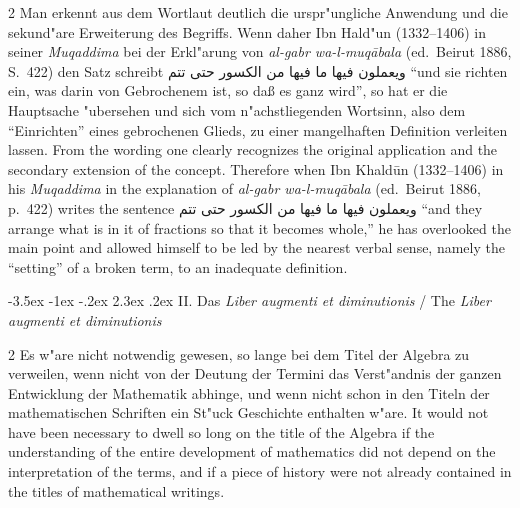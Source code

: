 \documentclass[10pt,a4paper]{article}
\makeatletter
\renewcommand{\switchcolumn}{\syncronize\nointerlineskip\columnbreak}
\newcommand{\RL}[1]{\beginR#1\endR}
\newcommand{\ar}[1]{{\arabicfont\RL{#1}}}
\renewcommand{\section}{\@startsection{section}{1}{\z@}%
  {-3.5ex \@plus -1ex \@minus -.2ex}%
  {2.3ex \@plus .2ex}%
  {\normalfont\Large\bfseries\color{sectioncolor}}}
\newcommand{\enquote}[1]{``#1''}
\makeatother
\begin{document}
\begin{paracol}{2}
Man erkennt aus dem Wortlaut deutlich die urspr"ungliche Anwendung und die sekund"are Erweiterung des Begriffs. Wenn daher Ibn Hald"un (1332--1406) in seiner \textit{Muqaddima} bei der Erkl"arung von \textit{al-gabr wa-l-muq\=abala} (ed.\ Beirut 1886, S.\ 422) den Satz schreibt \ar{ويعملون فيها ما فيها من الكسور حتى تتم} \enquote{und sie richten ein, was darin von Gebrochenem ist, so da\ss{} es ganz wird}, so hat er die Hauptsache "ubersehen und sich vom n"achstliegenden Wortsinn, also dem \enquote{Einrichten} eines gebrochenen Glieds, zu einer mangelhaften Definition verleiten lassen.
\switchcolumn
From the wording one clearly recognizes the original application and the secondary extension of the concept. Therefore when Ibn Khald\=un (1332--1406) in his \textit{Muqaddima} in the explanation of \textit{al-gabr wa-l-muq\=abala} (ed.\ Beirut 1886, p.\ 422) writes the sentence \ar{ويعملون فيها ما فيها من الكسور حتى تتم} ``and they arrange what is in it of fractions so that it becomes whole,'' he has overlooked the main point and allowed himself to be led by the nearest verbal sense, namely the ``setting'' of a broken term, to an inadequate definition.
\end{paracol}
\clearpage

\section{II. Das \textit{Liber augmenti et diminutionis} / The \textit{Liber augmenti et diminutionis}}

\begin{paracol}{2}
Es w"are nicht notwendig gewesen, so lange bei dem Titel der Algebra zu verweilen, wenn nicht von der Deutung der Termini das Verst"andnis der ganzen Entwicklung der Mathematik abhinge, und wenn nicht schon in den Titeln der mathematischen Schriften ein St"uck Geschichte enthalten w"are.
\switchcolumn
It would not have been necessary to dwell so long on the title of the Algebra if the understanding of the entire development of mathematics did not depend on the interpretation of the terms, and if a piece of history were not already contained in the titles of mathematical writings.
\end{paracol}
\end{document}
